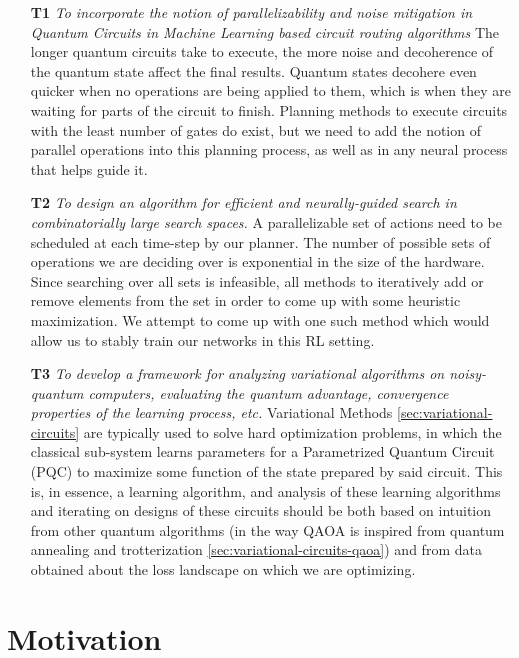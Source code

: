 \begin{enumerate}\label{enum:problems-addressed-by-thesis}
    \item[\textbf{T1}] \textit{To incorporate the notion of parallelizability and noise mitigation in Quantum Circuits in Machine Learning based circuit routing algorithms}
    The longer quantum circuits take to execute, the more noise and decoherence of the quantum state affect the final results. Quantum states decohere even quicker when no operations are being applied to them, which is when they are waiting for parts of the circuit to finish. Planning methods to execute circuits with the least number of gates do exist, but we need to add the notion of parallel operations into this planning process, as well as in any neural process that helps guide it.

    \item[\textbf{T2}] \textit{To design an algorithm for efficient and neurally-guided search in combinatorially large search spaces.}
    A parallelizable set of actions need to be scheduled at each time-step by our planner. The number of possible sets of operations we are deciding over is exponential in the size of the hardware. Since searching over all sets is infeasible, all methods to iteratively add or remove elements from the set in order to come up with some heuristic maximization. We attempt to come up with one such method which would allow us to stably train our networks in this RL setting.

    \item[\textbf{T3}] \textit{To develop a framework for analyzing variational algorithms on noisy-quantum computers, evaluating the quantum advantage, convergence properties of the learning process, etc.}
    Variational Methods \ref{sec:variational-circuits} are typically used to solve hard optimization problems, in which the classical sub-system learns parameters for a Parametrized Quantum Circuit (PQC) to maximize some function of the state prepared by said circuit. This is, in essence, a learning algorithm, and analysis of these learning algorithms and iterating on designs of these circuits should be both based on intuition from other quantum algorithms (in the way QAOA is inspired from quantum annealing and trotterization \ref{sec:variational-circuits-qaoa}) and from data obtained about the loss landscape on which we are optimizing.
\end{enumerate}

\section{Motivation}

